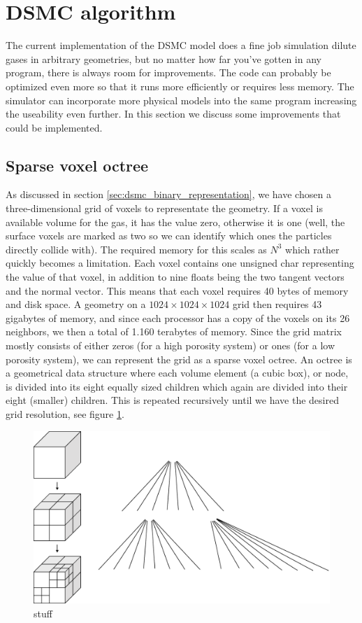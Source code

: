 \section{DSMC algorithm}
The current implementation of the DSMC model does a fine job simulation dilute gases in arbitrary geometries, but no matter how far you've gotten in any program, there is always room for improvements. The code can probably be optimized even more so that it runs more efficiently or requires less memory. The simulator can incorporate more physical models into the same program increasing the useability even further. In this section we discuss some improvements that could be implemented.
\subsection{Sparse voxel octree}
As discussed in section \ref{sec:dsmc_binary_representation}, we have chosen a three-dimensional grid of voxels to representate the geometry. If a voxel is available volume for the gas, it has the value zero, otherwise it is one (well, the surface voxels are marked as two so we can identify which ones the particles directly collide with). The required memory for this scales as $N^3$ which rather quickly becomes a limitation. Each voxel contains one unsigned char representing the value of that voxel, in addition to nine floats being the two tangent vectors and the normal vector. This means that each voxel requires 40 bytes of memory and disk space. A geometry on a $1024\times1024\times1024$ grid then requires 43 gigabytes of memory, and since each processor has a copy of the voxels on its 26 neighbors, we then a total of 1.160 terabytes of memory. Since the grid matrix mostly consists of either zeros (for a high porosity system) or ones (for a low porosity system), we can represent the grid as a sparse voxel octree\cite{laine2011efficient}. An octree is a geometrical data structure where each volume element (a cubic box), or node, is divided into its eight equally sized children which again are divided into their eight (smaller) children.  This is repeated recursively until we have the desired grid resolution, see figure \ref{fig:future_work_octree}. 
\begin{figure}[h]
\begin{center}
\includegraphics[width=\textwidth, trim=0cm 0cm 0cm 0cm, clip]{figures/octree.eps}
\end{center}
\caption{stuff}
\label{fig:future_work_octree}
\end{figure}
